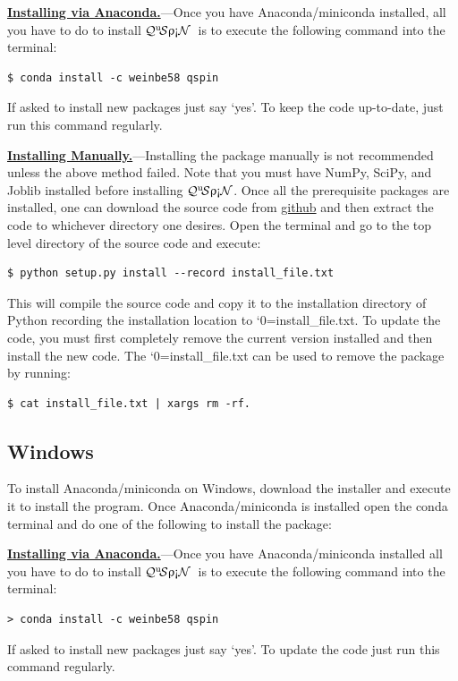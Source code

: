 \documentclass{SciPost}
\newcommand\0{\scalebox{-1}[1]{0}}
\let\svttfamily\ttfamily
\renewcommand\ttfamily{\svttfamily\catcode`0=\active }
\renewcommand\texttt{\bgroup\ttfamily\texttthelp}
\def\texttthelp#1{#1\egroup}
\newcommand{\qspin}{$\mathcal{Q}^{\mathrm{u}}\!\mathcal{S}\uprho\mathrm{\text{\textexclamdown}}\mathcal{N}$}
\begin{document}
\begin{appendix}
\underline{\bf Installing via Anaconda.}---Once you have Anaconda/miniconda installed, all you have to do to install \qspin\ is to execute the following command into the terminal: 
\begin{lstlisting}[numbers=none,keywordstyle=\ttfamily]
$ conda install -c weinbe58 qspin
\end{lstlisting}
If asked to install new packages just say `yes'. To keep the code up-to-date, just run this command regularly. 

\underline{\bf Installing Manually.}---Installing the package manually is not recommended unless the above method failed. Note that you must have NumPy, SciPy, and Joblib installed before installing \qspin. Once all the prerequisite packages are installed, one can download the source code from \href{https://github.com/weinbe58/qspin/tree/master}{github} and then extract the code to whichever directory one desires. Open the terminal and go to the top level directory of the source code and execute:
\begin{lstlisting}[numbers=none,keywordstyle=\ttfamily]  
$ python setup.py install --record install_file.txt
\end{lstlisting}
This will compile the source code and copy it to the installation directory of Python recording the installation location to \texttt{install\_file.txt}. To update the code, you must first completely remove the current version installed and then install the new code. The \texttt{install\_file.txt} can be used to remove the package by running:  
\begin{lstlisting}[numbers=none,keywordstyle=\ttfamily]  
$ cat install_file.txt | xargs rm -rf. 
\end{lstlisting}

\subsection{Windows}
To install Anaconda/miniconda on Windows, download the installer and execute it to install the program. Once Anaconda/miniconda is installed open the conda terminal and do one of the following to install the package:

\underline{\bf Installing via Anaconda.}---Once you have Anaconda/miniconda installed all you have to do to install \qspin\ is to execute the following command into the terminal: 
\begin{lstlisting}[numbers=none,keywordstyle=\ttfamily]
> conda install -c weinbe58 qspin
\end{lstlisting}
If asked to install new packages just say `yes'. To update the code just run this command regularly. 


\end{appendix}
\end{document}

